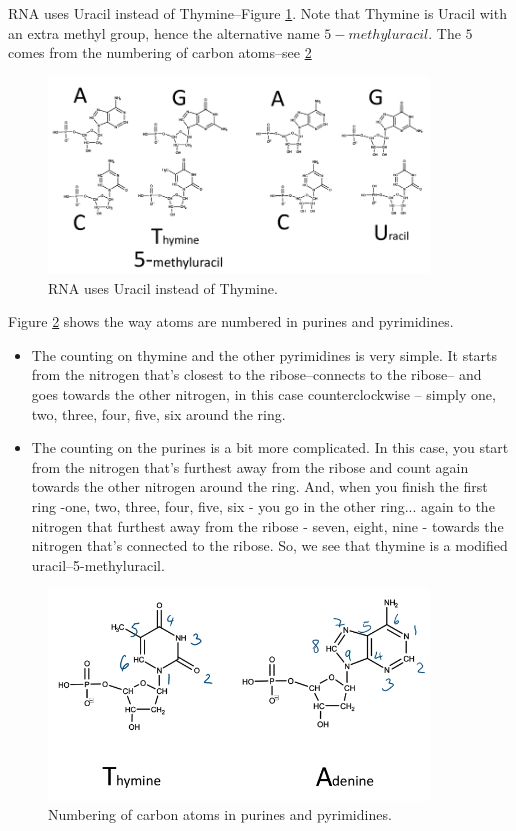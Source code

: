 \documentclass[]{article}
\begin{document}
RNA uses Uracil instead of Thymine--Figure \ref{fig:NucleotideDNARNAThymineUracil}. Note that Thymine is Uracil with an extra methyl group, hence the alternative name $5-methyluracil$. The $5$ comes from the numbering of carbon atoms--see \ref{fig:NucleotidesCounting}
	
\begin{figure}[H]
	\caption{RNA uses Uracil instead of Thymine.} \label{fig:NucleotideDNARNAThymineUracil} 
	\includegraphics[width=0.9\textwidth]{NucleotideDNARNAThymineUracil}
\end{figure}

Figure \ref{fig:NucleotidesCounting} shows the way atoms are numbered in purines and pyrimidines.\begin{itemize}
	\item The counting on thymine and the other pyrimidines is very simple.
	It starts from the nitrogen that's closest to the ribose--connects to the ribose--
	and goes towards the other nitrogen, in this case counterclockwise --
	simply one, two, three, four, five, six around the ring.
	\item The counting on the purines is a bit more complicated.
	In this case, you start from the nitrogen that's furthest away from the ribose 	and count again towards the other nitrogen around the ring.
	And, when you finish the first ring -one, two, three, four, five, six - you go in the other ring... 	again to the nitrogen 	that furthest away from the ribose - 	seven, eight, nine - towards the nitrogen that's connected to the ribose.
	So, we see that thymine is a modified uracil--5-methyluracil.
\end{itemize}
\begin{figure}[H]
	\caption{Numbering of carbon atoms in purines and pyrimidines. }\label{fig:NucleotidesCounting} 
	\includegraphics[width=0.9\textwidth]{NucleotidesCounting}
\end{figure}
\end{document}
